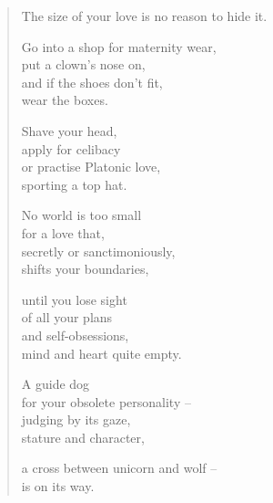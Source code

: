 \begin{verse}

The size of your love is no reason to hide it.

Go into a shop for maternity wear,\\
put a clown's nose on,\\
and if the shoes don't fit,\\
wear the boxes.

Shave your head,\\
apply for celibacy\\
or practise Platonic love,\\
sporting a top hat.

No world is too small\\
for a love that,\\
secretly or sanctimoniously,\\
shifts your boundaries,

until you lose sight\\
of all your plans\\
and self-obsessions,\\
mind and heart quite empty.

\clearpage

A guide dog\\
for your obsolete personality --\\
judging by its gaze,\\
stature and character,

a cross between unicorn and wolf --\\
is on its way.

\end{verse}
